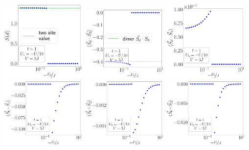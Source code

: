 \documentclass[10pt]{report}
\numberwithin{equation}{section}
\begin{document}
\begin{center}
	\includegraphics[width=0.32\textwidth]{../figures/EE-d-t=1.000,J=10.000,0.000,30,V=3J,Ubath=-U_by_10,N=6,U=1.000,889.513,30.pdf}
	\includegraphics[width=0.32\textwidth]{../figures/corr-d0-t=1.000,J=10.000,0.000,30,V=3J,Ubath=-U_by_10,N=6,U=1.000,889.513,30.pdf}
	\includegraphics[width=0.32\textwidth]{../figures/corr-d1-t=1.000,J=10.000,0.000,30,V=3J,Ubath=-U_by_10,N=6,U=1.000,889.513,30.pdf}
	\includegraphics[width=0.32\textwidth]{../figures/r-vec-corr-01-t=1.000,J=10.000,0.000,30,V=3J,Ubath=-U_by_10,N=6,U=1.000,889.513,30.pdf}
	\includegraphics[width=0.32\textwidth]{../figures/r-vec-corr-02-t=1.000,J=10.000,0.000,30,V=3J,Ubath=-U_by_10,N=6,U=1.000,889.513,30.pdf}
	\includegraphics[width=0.32\textwidth]{../figures/r-vec-corr-03-t=1.000,J=10.000,0.000,30,V=3J,Ubath=-U_by_10,N=6,U=1.000,889.513,30.pdf}

\end{center}
\end{document}
